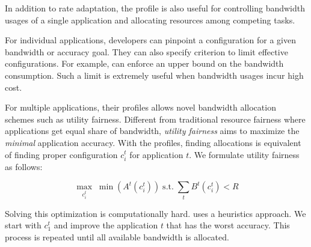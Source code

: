%     

 In addition to rate adaptation, the
profile is also useful for controlling bandwidth usages of a single application
and allocating resources among competing tasks.

For individual applications, developers can pinpoint a configuration for a given
bandwidth or accuracy goal. They can also specify criterion to limit effective
configurations. For example, \sysname{} can enforce an upper bound on the
bandwidth consumption. Such a limit is extremely useful when bandwidth usages
incur high cost.

For multiple applications, their profiles allows novel bandwidth allocation
schemes such as utility fairness. Different from traditional resource fairness
where applications get equal share of bandwidth, \textit{utility fairness} aims
to maximize the \textit{minimal} application accuracy. With the profiles,
finding allocations is equivalent of finding proper configuration $c_i^t$ for
application $t$. We formulate utility fairness as follows:

\begin{equation}
  \label{eq:multitask}
    \underset{c_i^t}{\max} \; \min({A^t(c_i^t)})
    \;
    \text{s.t.}
    \;
    \sum_t{B^t(c_i^t)} < R
\end{equation}

Solving this optimization is computationally hard. \sysname{} uses a heuristics
approach. We start with $c_1^t$ and improve the application $t$ that has the
worst accuracy. This process is repeated until all available bandwidth is
allocated.

